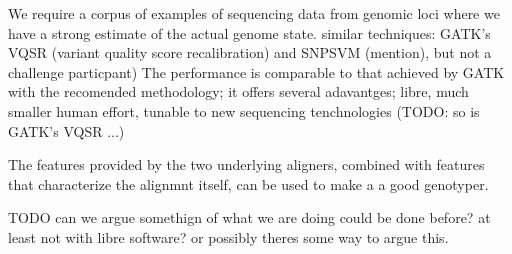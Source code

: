 \documentclass{article}
\begin{document}
We require a corpus of examples of sequencing data from genomic loci where we have a strong estimate of the actual genome state. %
 similar techniques: GATK's VQSR (variant quality score recalibration) and SNPSVM (mention), but not a challenge particpant)
The performance is comparable to that achieved by GATK with the recomended methodology; it offers several adavantges; libre, much smaller human effort, tunable to new sequencing tenchnologies (TODO: so is GATK's VQSR ...) 



The features provided by the two underlying aligners, combined with features that characterize the alignmnt itself, can be used to make a a good genotyper.




TODO can we argue somethign of what we are doing could be done before? at least not with libre software? or possibly theres some way to argue this.



\end{document}
